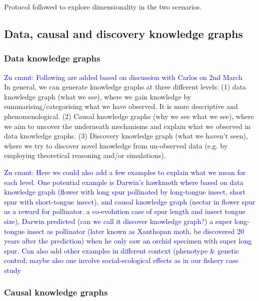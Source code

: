 \documentclass[12pt,a4paper]{article}
\newcommand{\Zu}[1]{\textcolor{blue}{\rm{Zu cmmt:} #1 \rm}}
\begin{document}
Protocol followed to explore dimensionality in the two scenarios. 


\subsection{Data, causal and discovery knowledge graphs}

\subsubsection{Data knowledge graphs}
\Zu{Following are added based on discussion with Carlos on 2nd March}\\
In general, we can generate knowledge graphs at three different levels: (1) data knowledge graph (what we see), where we gain knowledge by summarising/categorising what we have observed. It is more descriptive and phenomenological. (2) Causal knowledge graphs (why we see what we see), where we aim to uncover the underneath mechanisms and explain what we observed in data knowledge graphs. (3) Discovery knowledge graph (what we haven't seen), where we try to discover novel knowledge from un-observed data (e.g. by employing theoretical reasoning and/or simulations).

\Zu{Here we could also add a few examples to explain what we mean for each level. One potential example is Darwin's hawkmoth where based on data knowledge graph (flower with long spur pollinated by long-tongue insect, short spur with short-tongue insect), and causal knowledge graph (nectar in flower spur as a reward for pollinator. a co-evolution case of spur length and insect tongue size), Darwin predicted (can we call it discover knowledge graph?) a super long-tongue insect as pollinator (later known as Xanthopan moth, be discovered 20 years after the prediction) when he only saw an orchid specimen with super long spur. Can also add other examples in different context (phenotype \& genetic control; maybe also one involve social-ecological effects as in our fishery case study}

\subsubsection{Causal knowledge graphs}
\end{document}
